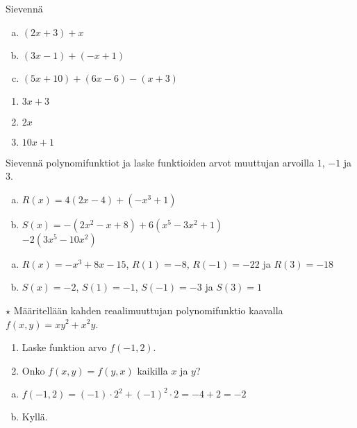 \begin{tehtavasivu}
\begin{tehtava}
     Sievennä
     \begin{enumerate}[a)]
         \item $(2x + 3) + x $
         \item $(3x - 1) + (-x + 1)$
         \item $(5x + 10) + (6x - 6) - (x + 3)$
     \end{enumerate}
     \begin{vastaus}
         \begin{enumerate}
             \item $3x + 3$
             \item $2x$
             \item $10x + 1$
         \end{enumerate}
     \end{vastaus}
 \end{tehtava}

\begin{tehtava}
	Sievennä polynomifunktiot ja laske funktioiden arvot muuttujan arvoilla $1$, $-1$ ja $3$.
	\begin{enumerate}[a)]
		\item $R(x)=4(2x-4)+(-x^3+1)$
		\item $S(x)=-(2x^2-x+8)+6(x^5-3x^2+1)$ \\ $-2(3x^5-10x^2)$
	\end{enumerate}
	\begin{vastaus}
		\begin{enumerate}[a)]
			\item $R(x)=-x^3+8x-15$, $R(1)=-8$, $R(-1)=-22$ ja $R(3)=-18$
			\item $S(x)=-2$, $S(1)=-1$, $S(-1)=-3$ ja $S(3)=1$
		\end{enumerate}
	\end{vastaus}
\end{tehtava}

\begin{tehtava}
	$\star$ Määritellään kahden reaalimuuttujan polynomifunktio kaavalla $f(x,y)=xy^2+x^2y$.
		\begin{enumerate}
		\item Laske funktion arvo $f(-1,2)$.
		\item Onko $f(x,y)=f(y,x)$ kaikilla $x$ ja $y$?
		\end{enumerate}	
	
	\begin{vastaus}
		\begin{enumerate}[a)]
			\item $f(-1,2)=(-1)\cdot 2^2+(-1)^2 \cdot 2=-4+2=-2$
			\item Kyllä.
		\end{enumerate}
	\end{vastaus}
\end{tehtava}


\end{tehtavasivu}

